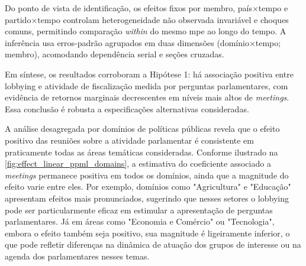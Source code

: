 Do ponto de vista de identificação, os efeitos fixos por membro, país$\times$tempo e partido$\times$tempo controlam heterogeneidade não observada invariável e choques comuns, permitindo comparação \textit{within} do mesmo \acrshort{mpe} ao longo do tempo. A inferência usa erros-padrão agrupados em duas dimensões (domínio$\times$tempo; membro), acomodando dependência serial e seções cruzadas.

Em síntese, os resultados corroboram a Hipótese 1: há associação positiva entre lobbying e atividade de fiscalização medida por perguntas parlamentares, com evidência de retornos marginais decrescentes em níveis mais altos de \textit{meetings}. Essa conclusão é robusta a especificações alternativas consideradas.

A análise desagregada por domínios de políticas públicas revela que o efeito positivo das reuniões sobre a atividade parlamentar é consistente em praticamente todas as áreas temáticas consideradas. Conforme ilustrado na \autoref{fig:effect_linear_ppml_domains}, a estimativa do coeficiente associado a \textit{meetings} permanece positiva em todos os domínios, ainda que a magnitude do efeito varie entre eles. Por exemplo, domínios como "Agricultura" e "Educação" apresentam efeitos mais pronunciados, sugerindo que nesses setores o lobbying pode ser particularmente eficaz em estimular a apresentação de perguntas parlamentares. Já em áreas como "Economia e Comércio" ou "Tecnologia", embora o efeito também seja positivo, sua magnitude é ligeiramente inferior, o que pode refletir diferenças na dinâmica de atuação dos grupos de interesse ou na agenda dos parlamentares nesses temas.

